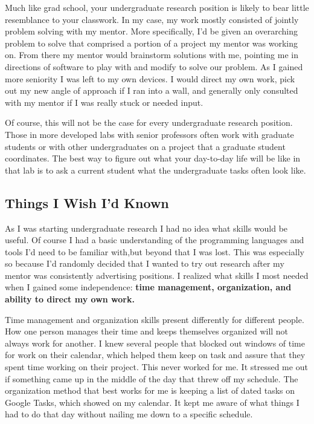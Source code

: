 \documentclass[12pt]{article}
\begin{document}
Much like grad school, your undergraduate research position is likely to bear little resemblance to your classwork. In my case, my work mostly consisted of jointly problem solving with my mentor. More specifically, I'd be given an overarching problem to solve that comprised a portion of a project my mentor was working on. From there my mentor would brainstorm solutions with me, pointing me in directions of software to play with and modify to solve our problem. As I gained more seniority I was left to my own devices. I would direct my own work, pick out my new angle of approach if I ran into a wall, and generally only consulted with my mentor if I was really stuck or needed input.

Of course, this will not be the case for every undergraduate research position. Those in more developed labs with senior professors often work with graduate students or with other undergraduates on a project that a graduate student coordinates. The best way to figure out what your day-to-day life will be like in that lab is to ask a current student what the undergraduate tasks often look like.

\subsection{Things I Wish I'd Known}

As I was starting undergraduate research I had no idea what skills would be useful. Of course I had a basic understanding of the programming languages and tools I’d need to be familiar with,but beyond that I was lost. This was especially so because I’d randomly decided that I wanted to try out research after my mentor was consistently advertising positions. I realized what skills I most needed when I gained some independence: \textbf{time management, organization, and ability to direct my own work.}

Time management and organization skills present differently for different people. How one person manages their time and keeps themselves organized will not always work for another. I knew several people that blocked out windows of time for work on their calendar, which helped them keep on task and assure that they spent time working on their project. This never worked for me. It stressed me out if something came up in the middle of the day that threw off my schedule. The organization method that best works for me is keeping a list of dated tasks on Google Tasks, which showed on my calendar. It kept me aware of what things I had to do that day without nailing me down to a specific schedule.
\end{document}
